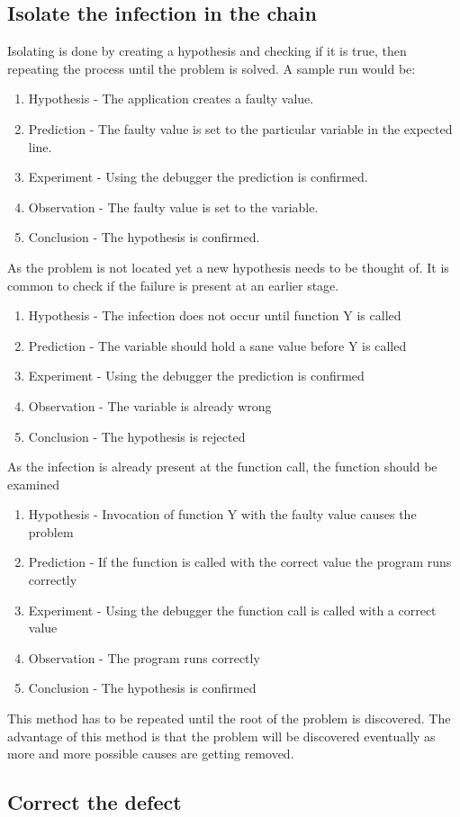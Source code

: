 \subsection{Isolate the infection in the chain}
Isolating is done by creating a hypothesis and checking if it is true, then repeating the process until the problem is solved. A sample run would be:
\begin{enumerate}
  \item Hypothesis - The application creates a faulty value.
  \item Prediction - The faulty value is set to the particular variable in the expected line.
  \item Experiment - Using the debugger the prediction is confirmed.
  \item Observation - The faulty value is set to the variable.
  \item Conclusion - The hypothesis is confirmed.
\end{enumerate}
As the problem is not located yet a new hypothesis needs to be thought of. It is common to check if the failure is present at an earlier stage.
\begin{enumerate}
  \item Hypothesis - The infection does not occur until function Y is called
  \item Prediction - The variable should hold a sane value before Y is called
  \item Experiment - Using the debugger the prediction is confirmed
  \item Observation - The variable is already wrong
  \item Conclusion - The hypothesis is rejected
\end{enumerate}
As the infection is already present at the function call, the function should be examined
\begin{enumerate}
  \item Hypothesis - Invocation of function Y with the faulty value causes the problem
  \item Prediction - If the function is called with the correct value the program runs correctly
  \item Experiment - Using the debugger the function call is called with a correct value
  \item Observation - The program runs correctly
  \item Conclusion - The hypothesis is confirmed
\end{enumerate}
This method has to be repeated until the root of the problem is discovered. The advantage of this method is that the problem will be discovered eventually as more and more possible causes are getting removed.

\subsection{Correct the defect}

